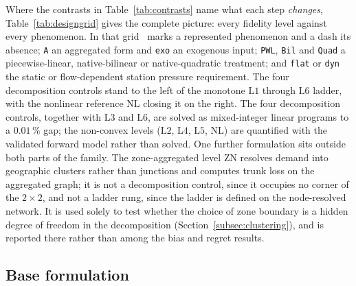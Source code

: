 \documentclass[a4paper,fleqn]{cas-sc}
\newcommand{\ZN}{\ensuremath{\mathrm{ZN}}}      %
\newcommand{\Lone}{\ensuremath{\mathrm{L1}}}    %
\newcommand{\Ltwo}{\ensuremath{\mathrm{L2}}}    %
\newcommand{\Lthree}{\ensuremath{\mathrm{L3}}}  %
\newcommand{\Lfour}{\ensuremath{\mathrm{L4}}}   %
\newcommand{\Lfive}{\ensuremath{\mathrm{L5}}}   %
\newcommand{\Lsix}{\ensuremath{\mathrm{L6}}}    %
\newcommand{\NLref}{\ensuremath{\mathrm{NL}}}   %
\renewcommand{\checkmark}{\ding{51}}
\newcommand{\new}[1]{\textcolor[HTML]{1A5FB4}{#1}}   %
\newcommand{\new}[1]{#1}
\begin{document}
Where the contrasts in Table~\ref{tab:contrasts} name what each step \emph{changes},
Table~\ref{tab:designgrid} gives the complete picture: every fidelity level against every
phenomenon. In that grid \checkmark\ marks a represented phenomenon and a dash its absence;
\texttt{A} an aggregated form and \texttt{exo} an exogenous input; \texttt{PWL}, \texttt{Bil}
and \texttt{Quad} a piecewise-linear, native-bilinear or native-quadratic treatment; and
\texttt{flat} or \texttt{dyn} the static or flow-dependent station pressure requirement. The
four decomposition controls stand to the left of the monotone $\Lone$ through $\Lsix$ ladder,
with the nonlinear reference $\NLref$ closing it on the right.
The four decomposition controls, together with $\Lthree$ and $\Lsix$, are solved as
mixed-integer linear programs to a $0.01$\,\% gap; the non-convex levels
($\Ltwo$, $\Lfour$, $\Lfive$, $\NLref$) are quantified with the validated forward model
rather than solved. 
One further formulation sits outside both parts of the family. The zone-aggregated level
$\ZN$ resolves demand into geographic clusters rather than junctions and computes trunk
loss on the aggregated graph; it is not a decomposition control, since it occupies no
corner of the $2\times2$, and not a ladder rung, since the ladder is defined on the
node-resolved network. It is used solely to test whether the choice of zone boundary is a
hidden degree of freedom in the decomposition (Section~\ref{subsec:clustering}), and is
reported there rather than among the bias and regret results.


\subsection{Base formulation}
\new{}
\end{document}
